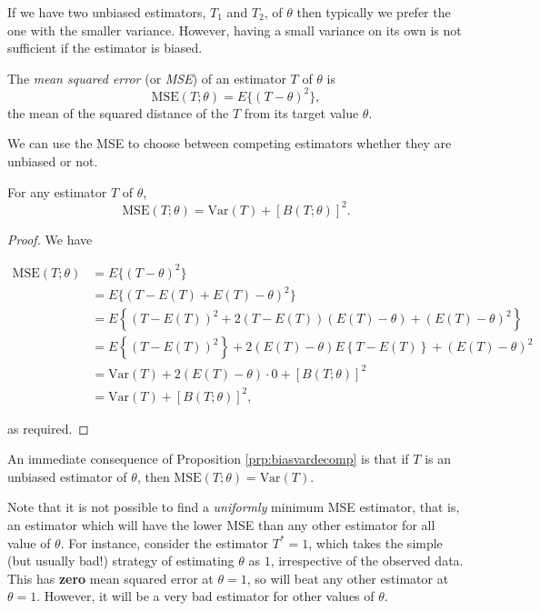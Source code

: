 \documentclass[]{book}
\theoremstyle{definition}
\theoremstyle{definition}
\theoremstyle{definition}
\theoremstyle{remark}
\let\BeginKnitrBlock\begin \let\EndKnitrBlock\end
\begin{document}
If we have two unbiased estimators, \(T_1\) and \(T_2\), of \(\theta\)
then typically we prefer the one with the smaller variance. However,
having a small variance on its own is not sufficient if the estimator is
biased.

\BeginKnitrBlock{definition}
\protect\hypertarget{def:unnamed-chunk-90}{}{\label{def:unnamed-chunk-90}
}The \emph{mean squared error} (or \emph{MSE}) of an estimator \(T\) of
\(\theta\) is \[\text{MSE}(T; \theta) = E\{(T - \theta)^2\},\] the mean
of the squared distance of the \(T\) from its target value \(\theta.\)
\EndKnitrBlock{definition}

We can use the MSE to choose between competing estimators whether they
are unbiased or not.

\BeginKnitrBlock{proposition}
\protect\hypertarget{prp:biasvardecomp}{}{\label{prp:biasvardecomp} }For any
estimator \(T\) of \(\theta\),
\[\text{MSE}(T; \theta) = \text{Var}(T) + \left[B(T; \theta)\right]^2.\]
\EndKnitrBlock{proposition} \BeginKnitrBlock{proof}

\iffalse{} {Proof. } \fi{}We have

\begin{align*}
\text{MSE}(T; \theta) &= E\{(T - \theta)^2\} \\
&= E\{(T - E(T) + E(T) - \theta)^2\}  \\
&= E\left\{(T - E(T))^2 + 2(T - E(T))(E(T) - \theta)
+ (E(T) - \theta)^2 \right\} \\
&= E\left\{(T - E(T))^2 \right\} + 2(E(T) - \theta) 
E\left\{T - E(T) \right\} +(E(T) - \theta)^2 \\
&= \text{Var}(T) + 2(E(T) - \theta) \cdot 0 + \left[B(T; \theta)\right]^2 \\
&= \text{Var}(T) + \left[B(T; \theta)\right]^2,
\end{align*}

as required.
\EndKnitrBlock{proof}

An immediate consequence of Proposition \ref{prp:biasvardecomp} is that
if \(T\) is an unbiased estimator of \(\theta\), then
\(\text{MSE}(T; \theta) = \text{Var}(T)\).

Note that it is not possible to find a \emph{uniformly} minimum MSE
estimator, that is, an estimator which will have the lower MSE than any
other estimator for all value of \(\theta\). For instance, consider the
estimator \(T^* = 1\), which takes the simple (but usually bad!)
strategy of estimating \(\theta\) as \(1\), irrespective of the observed
data. This has \textbf{zero} mean squared error at \(\theta = 1\), so
will beat any other estimator at \(\theta = 1\). However, it will be a
very bad estimator for other values of \(\theta\).
\end{document}
